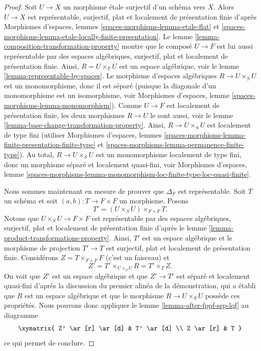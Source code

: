 \begin{proof}
Soit $U \to X$ un morphisme étale surjectif d'un schéma vers $X$.
Alors $U \to X$ est représentable, surjectif, plat et
localement de présentation finie d'après
Morphismes d'espaces,
lemmes \ref{spaces-morphisms-lemma-etale-flat} et
\ref{spaces-morphisms-lemma-etale-locally-finite-presentation}.
Le
lemme \ref{lemma-composition-transformation-property}
montre que le composé $U \to F$ est lui aussi représentable par des espaces algébriques,
surjectif, plat et localement de présentation finie.
Ainsi, $R = U \times_F U$ est un espace algébrique, voir le
lemme \ref{lemma-representable-by-spaces}.
Le morphisme d'espaces algébriques $R \to U \times_S U$ est
un monomorphisme, donc il est séparé (puisque la diagonale d'un monomorphisme
est un isomorphisme, voir
Morphismes d'espaces,
lemme \ref{spaces-morphisms-lemma-monomorphism}).
Comme $U \to F$ est localement de présentation finie, les deux
morphismes $R \to U$ le sont aussi, voir le
lemme \ref{lemma-base-change-transformation-property}.
Ainsi, $R \to U \times_S U$ est localement de type fini (utiliser
Morphismes d'espaces,
lemmes \ref{spaces-morphisms-lemma-finite-presentation-finite-type} et
\ref{spaces-morphisms-lemma-permanence-finite-type}).
Au total,
$R \to U \times_S U$ est un monomorphisme localement de type
fini, donc un morphisme séparé et localement quasi-fini, voir
Morphismes d'espaces, lemme
\ref{spaces-morphisms-lemma-monomorphism-loc-finite-type-loc-quasi-finite}.

\medskip\noindent
Nous sommes maintenant en mesure de prouver que $\Delta_F$ est représentable.
Soit $T$ un schéma et soit $(a, b) : T \to F \times F$ un morphisme.
Posons
$$
T' = (U \times_S U) \times_{F \times F} T.
$$
Notons que $U \times_S U \to F \times F$ est
représentable par des espaces algébriques, surjectif, plat et
localement de présentation finie d'après le
lemme \ref{lemma-product-transformations-property}.
Ainsi, $T'$ est un espace algébrique et le morphisme de projection
$T' \to T$ est surjectif, plat et localement de présentation finie.
Considérons $Z = T \times_{F \times F} F$ (c'est un faisceau) et
$$
Z' = T' \times_{U \times_S U} R
= T' \times_T Z.
$$
On voit que $Z'$ est un espace algébrique et que
$Z' \to T'$ est séparé et localement quasi-fini d'après la
discussion du premier alinéa de la démonstration, qui a établi que $R$ est
un espace algébrique et que le
morphisme $R \to U \times_S U$ possède ces propriétés.
Nous pouvons donc appliquer le
lemme \ref{lemma-after-fppf-sep-lqf}
au diagramme
$$
\xymatrix{
Z' \ar[r] \ar[d] & T' \ar[d] \\
Z \ar[r] & T
}
$$
ce qui permet de conclure.
\end{proof}

